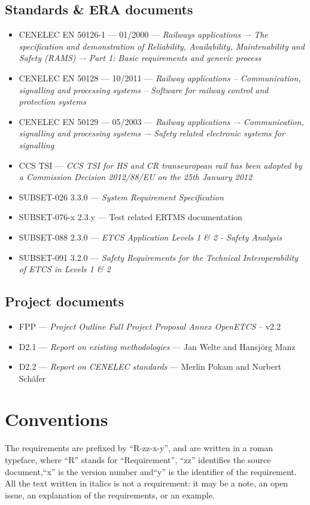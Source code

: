 \documentclass{template/openetcs_article}
\begin{document}
\subsection{Standards \& ERA documents}
\begin{itemize}
\item CENELEC EN 50126-1 --- 01/2000 --- \emph{Railways applications –- The specification and 
demonstration of Reliability, Availability, Maintenability and Safety (RAMS) –- Part 1: 
Basic requirements and generic process}
\item CENELEC EN 50128 --- 10/2011 --- \emph{Railway applications -- Communication, signalling and 
processing systems -- Software for railway control and protection systems}
\item CENELEC EN 50129 --- 05/2003 --- \emph{Railway applications –- Communication, signalling and 
processing systems –- Safety related electronic systems for signalling}
\item CCS TSI --- \emph{ CCS TSI for HS and CR transeuropean rail has been adopted by a Commission Decision 2012/88/EU on the 25th January 2012}
\item SUBSET-026 3.3.0 --- \emph{System Requirement Specification}
\item SUBSET-076-x 2.3.y --- Test related ERTMS documentation
\item SUBSET-088 2.3.0 --- \emph{ETCS Application Levels 1 \& 2 - Safety Analysis}
\item SUBSET-091 3.2.0 --- \emph{Safety Requirements for the Technical Interoperability
of ETCS in Levels 1 \& 2}
\end{itemize}
\subsection{Project documents}
\begin{itemize}
\item FPP --- \emph{Project Outline Full Project Proposal Annex OpenETCS} -- v2.2
\item D2.1 --- \emph{Report on existing methodologies} --- Jan Welte and Hansj\"org Manz
\item D2.2 --- \emph{Report on CENELEC standards} --- Merlin Pokam and Norbert Sch\"afer
\end{itemize}

\section{Conventions}
The requirements are prefixed by “R-zz-x-y”, and are written in a roman typeface, where ``R'' 
stands for ``Requirement'', ``zz'' identifies the source document,``x'' 
is the version number and``y'' is the identifier of the requirement. All the text 
written in italics is not a requirement: it may be a note, an open issue, an 
explanation of the requirements, or an example.
\end{document}
